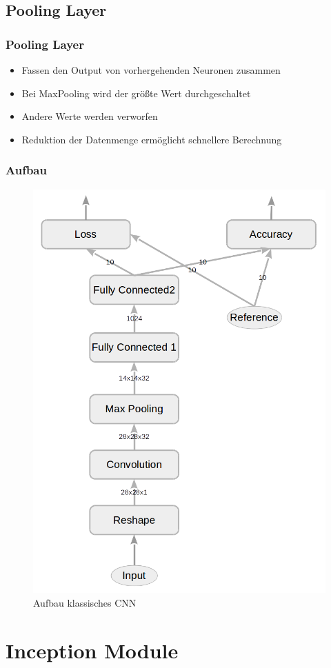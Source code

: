 \documentclass{beamer}
\begin{document}

\subsection{Pooling Layer}

\begin{frame}
	\frametitle{Pooling Layer}
	\begin{itemize}
		\item Fassen den Output von vorhergehenden Neuronen zusammen
		\item Bei MaxPooling wird der größte Wert durchgeschaltet
		\item Andere Werte werden verworfen
		\item Reduktion der Datenmenge ermöglicht schnellere Berechnung
	\end{itemize}
\end{frame}

\begin{frame}
	\frametitle{Aufbau}
	\begin{figure}
		\includegraphics[width=0.4\linewidth]{images/main_graph_conv_reduced.png}
		\caption{Aufbau klassisches CNN}
		\label{fig:main_graph_conv}
	\end{figure}
\end{frame}

\section{Inception Module}
\end{document}
